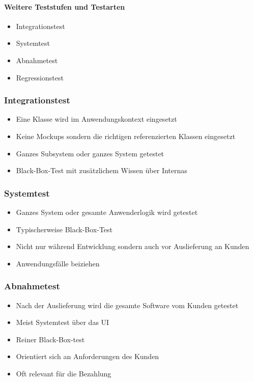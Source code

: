 \documentclass[../ZF_SWEN1.tex]{subfiles}
\begin{document}
\paragraph{Weitere Teststufen und Testarten}
\begin{itemize}
	\item Integrationstest
	\item Systemtest
	\item Abnahmetest
	\item Regressionstest
\end{itemize}

\subsubsection{Integrationstest}
\begin{itemize}
	\item Eine Klasse wird im Anwendungskontext eingesetzt
	\item Keine Mockups sondern die richtigen referenzierten Klassen eingesetzt
	\item Ganzes Subsystem oder ganzes System getestet
	\item Black-Box-Test mit zusätzlichem Wissen über Internas
\end{itemize}


\subsubsection{Systemtest}
\begin{itemize}
	\item Ganzes System oder gesamte Anwenderlogik wird getestet
	\item Typischerweise Black-Box-Test
	\item Nicht nur während Entwicklung sondern auch vor Auslieferung an Kunden
	\item Anwendungsfälle beiziehen
\end{itemize}


\subsubsection{Abnahmetest}
\begin{itemize}
	\item Nach der Auslieferung wird die gesamte Software vom Kunden getestet
	\item Meist Systemtest über das UI
	\item Reiner Black-Box-test
	\item Orientiert sich an Anforderungen des Kunden
	\item Oft relevant für die Bezahlung
\end{itemize}
\end{document}
